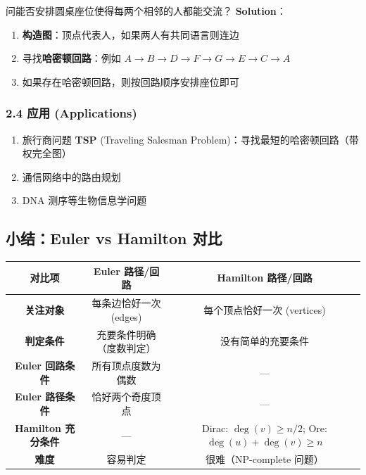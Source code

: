 \documentclass[10pt,a4paper,openany]{ctexbook}
\theoremstyle{definition}
\theoremstyle{remark}
\begin{document}
问能否安排圆桌座位使得每两个相邻的人都能交流？
\textbf{Solution}：
\begin{enumerate}
\item \textbf{构造图}：顶点代表人，如果两人有共同语言则连边
\item 寻找\textbf{哈密顿回路}：例如 $A \to B \to D \to F \to G \to E \to C \to A$
\item 如果存在哈密顿回路，则按回路顺序安排座位即可

\end{enumerate}

\vspace{-2pt}

\subsubsection{2.4 应用 (Applications)}

\begin{enumerate}
\item 旅行商问题 \textbf{TSP} (Traveling Salesman Problem)：寻找最短的哈密顿回路（带权完全图）
\item 通信网络中的路由规划
\item DNA 测序等生物信息学问题

\end{enumerate}

\vspace{-2pt}

\subsection{小结：Euler vs Hamilton 对比}

\begin{center}
\begin{tabular}{ccc}
\hline
对比项 & Euler 路径/回路 & Hamilton 路径/回路 \\ \hline
\textbf{关注对象} & 每条边恰好一次 (edges) & 每个顶点恰好一次 (vertices) \\
\textbf{判定条件} & 充要条件明确（度数判定） & 没有简单的充要条件 \\
\textbf{Euler 回路条件} & 所有顶点度数为偶数 & — \\
\textbf{Euler 路径条件} & 恰好两个奇度顶点 & — \\
\textbf{Hamilton 充分条件} & — & Dirac: $\deg(v) \ge n/2$; Ore: $\deg(u)+\deg(v) \ge n$ \\
\textbf{难度} & 容易判定 & 很难（NP-complete 问题） \\
\hline
\end{tabular}

\end{center}
\end{document}
